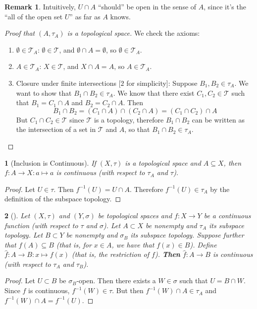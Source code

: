 \documentclass[11pt]{article}
\numberwithin{equation}{section}
\theoremstyle{plain}
\newtheorem{claim}{\color{ForestGreen}{\textbf{Claim}}}[section]
\theoremstyle{definition}
\newtheorem*{remark}{Remark}
\newcommand\inv[1]{#1^{-1}}
\def\ss{\subset}
\def\sse{\subseteq}
\newcommand{\1}{\mathbbm 1}
\def\t{\tau}
\newcommand{\tT}{\mathcal T}
\begin{document}
\begin{remark}
	Intuitively, $U \cap A$ ``should'' be open in the sense of $A$, since it's the ``all of the open set $U$'' as far as $A$ knows. 
\end{remark}


\begin{proof}[Proof that $(A, \t_A)$ is a topological space]
	We check the axioms:
	\begin{enumerate}
		\item $\emptyset \in \tT_A$: $\emptyset \in \tT$, and $\emptyset \cap A = \emptyset$, so $\emptyset \in \tT_A$. 
		\item $A \in \tT_A$: $X \in \tT$, and $X \cap A = A$, so $A \in \tT_A$.  
		\item Closure under finite intersections [$2$ for simplicity]: Suppose $B_1, B_2 \in \t_A$. We want to show that $B_1 \cap B_2 \in \t_A$. We know that there exist $C_1, C_2 \in \tT$ such that $B_1 = C_1 \cap A$ and $B_2 = C_2 \cap A$. Then
		\begin{equation}
			B_1 \cap B_2 = (C_1 \cap A) \cap (C_2 \cap A) = (C_1 \cap C_2) \cap A
		\end{equation}
		But $C_1 \cap C_2 \in \tT$ since $\tT$ is a topology, therefore $B_1 \cap B_2$ can be written as the intersection of a set in $\tT$ and $A$, so that $B_1 \cap B_2 \in \t_A$. 
	\end{enumerate}
\end{proof}

\begin{claim}[Inclusion is Continuous]
	If $(X,\t)$ is a topological space and $A \sse X$, then $f:A \to X:a \mapsto a$ is continuous (with respect to $\t_A$ and $\tau$).
\end{claim}
\begin{proof}
	Let $U \in \t$. Then $\inv{f}(U) = U \cap A$. Therefore $\inv{f}(U) \in \t_A$ by the definition of the subspace topology. 
\end{proof}

\begin{claim}[]
	Let $(X,\t)$ and $(Y,\sigma)$ be topological spaces and $f: X\to Y$ be a continuous function (with respect to $\t$ and $\sigma$). Let $A \ss X$ be nonempty and $\t_A$ its subspace topology. Let $B \ss Y$ be nonempty and $\sigma_B$ its subspace topology. Suppose further that $f(A) \sse B$ (that is, for $x \in A$, we have that $f(x) \in B$). Define $\hat f: A\to B: x \mapsto f(x)$ (that is, the restriction of $f$). \textbf{Then} $\hat f: A \to B$ is continuous (with respect to $\t_A$ and $\t_B$). 
\end{claim}
\begin{proof}
	Let $U \ss B$ be $\sigma_B$-open. Then there exists a $W \in \sigma$ such that $U = B \cap W$. Since $f$ is continuous, $\inv{f}(W) \in \t$.  But then $\inv{f}(W) \cap A \in \t_A$ and $\inv{f}(W) \cap A = \inv{f}(U)$. 

\end{proof}
\end{document}
